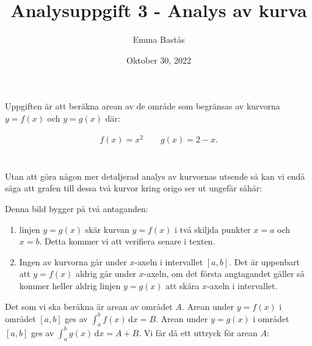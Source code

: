 \documentclass{article}
\title{Analysuppgift 3 - Analys av kurva}
\author{Emma Bastås}
\date{Oktober 30, 2022}
\begin{document}
\maketitle

\noindent Uppgiften är att beräkna arean av de område som begränsas av kurvorna $y = f(x)$ och $y = g(x)$ där:

\begin{gather*}
  f(x) = x^{2} \quad\quad g(x) = 2 - x\text{.}
\end{gather*}
\\
\\
Utan att göra någon mer detaljerad analys av kurvornas utsende så kan vi endå säga att grafen till dessa två kurvor kring origo ser ut ungefär såhär:

\begin{center}
\end{center}

Denna bild bygger på två antaganden:

\begin{enumerate}
        \item linjen $y = g(x)$ skär kurvan $y = f(x)$ i två skiljda punkter $x = a$ och $x = b$. Detta kommer vi att verifiera senare i texten.
        \item Ingen av kurvorna går under $x$-axeln i intervallet $[a,b]$. Det är uppenbart att $y = f(x)$ aldrig går under $x$-axeln, om det första angtagandet gäller så kommer heller aldrig linjen $y = g(x)$ att skära $x$-axeln i intervallet.
\end{enumerate}

\noindent Det som vi ska beräkna är arean av området $A$. Arean under $y = f(x)$ i området $[a, b]$ ges av $\int_{a}^{b} f(x) \,\mathrm{d}x = B$. Arean under $y = g(x)$ i området $[a, b]$ ges av $\int_{a}^{b} g(x) \,\mathrm{d}x = A + B$. Vi får då ett uttryck för arean $A$:
\end{document}
